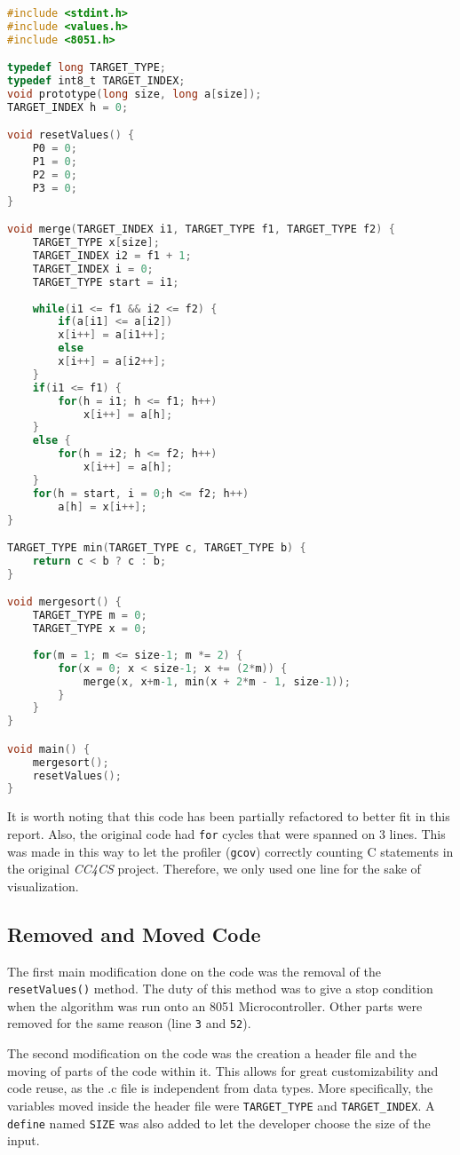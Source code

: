 \begin{lstlisting}[label=lst:mergesort_original,caption=Original Mergesort Code,language=C,tabsize=4]
#include <stdint.h>
#include <values.h>
#include <8051.h>

typedef long TARGET_TYPE;
typedef int8_t TARGET_INDEX;
void prototype(long size, long a[size]);
TARGET_INDEX h = 0;

void resetValues() {
	P0 = 0;
	P1 = 0;
	P2 = 0;
	P3 = 0;
}

void merge(TARGET_INDEX i1, TARGET_TYPE f1, TARGET_TYPE f2) {
	TARGET_TYPE x[size];
	TARGET_INDEX i2 = f1 + 1;
	TARGET_INDEX i = 0;
	TARGET_TYPE start = i1;	
	
	while(i1 <= f1 && i2 <= f2) {
		if(a[i1] <= a[i2])
		x[i++] = a[i1++];
		else
		x[i++] = a[i2++];
	}
	if(i1 <= f1) {
		for(h = i1; h <= f1; h++) 
			x[i++] = a[h];
	}
	else {
		for(h = i2; h <= f2; h++)
			x[i++] = a[h];
	}
	for(h = start, i = 0;h <= f2; h++)
		a[h] = x[i++];
}

TARGET_TYPE min(TARGET_TYPE c, TARGET_TYPE b) {
	return c < b ? c : b;
}

void mergesort() {
	TARGET_TYPE m = 0;
	TARGET_TYPE x = 0;
	
	for(m = 1; m <= size-1; m *= 2) {
		for(x = 0; x < size-1; x += (2*m)) {
			merge(x, x+m-1, min(x + 2*m - 1, size-1));
		}
	}
}

void main() {
	mergesort();
	resetValues();
}
\end{lstlisting}


It is worth noting that this code has been partially refactored to better fit in this report. Also, the original code had \texttt{for} cycles that were spanned on 3 lines. This was made in this way to let the profiler (\texttt{gcov}) correctly counting C statements in the original \textit{CC4CS} project. Therefore, we only used one line for the sake of visualization.

\subsection{Removed and Moved Code}

The first main modification done on the code was the removal of the \texttt{resetValues()} method. The duty of this method was to give a stop condition when the algorithm was run onto an 8051 Microcontroller. Other parts were removed for the same reason (line \texttt{3} and \texttt{52}).

The second modification on the code was the creation a header file and the moving of parts of the code within it. This allows for great customizability and code reuse, as the .c file is independent from data types. More specifically, the variables moved inside the header file were \texttt{TARGET\_TYPE} and \texttt{TARGET\_INDEX}. A \texttt{define} named \texttt{SIZE} was also added to let the developer choose the size of the input.

